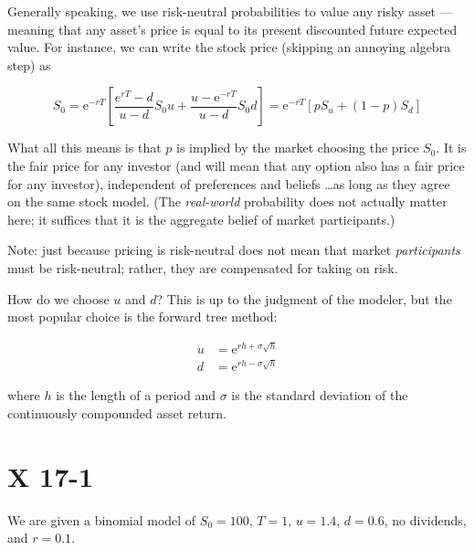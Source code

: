 \documentclass[12pt, letterpaper]{article}
\newcommand{\e}{\mathrm{e}}
\begin{document}
    Generally speaking, we use risk-neutral probabilities to value any risky asset --- meaning that any asset's price is equal to its present discounted future expected value. For instance, we can write the stock price (skipping an annoying algebra step) as

    \[ S_0 = \e^{-rT} \left[ \frac{e^{rT} - d}{u - d} S_0 u + \frac{u - \e^{-rT}}{u - d} S_0 d \right] = \e^{-rT} \left[ p S_u + (1 - p) S_d \right]   \]

    What all this means is that \(p\) is implied by the market choosing the price \(S_0\). It is the fair price for any investor (and will mean that any option also has a fair price for any investor), independent of preferences and beliefs \dots  as long as they agree on the same stock model. (The \emph{real-world} probability does not actually matter here; it suffices that it is the aggregate belief of market participants.) 

    Note: just because pricing is risk-neutral does not mean that market \emph{participants} must be risk-neutral; rather, they are compensated for taking on risk.

    How do we choose \(u\) and \(d\)? This is up to the judgment of the modeler, but the most popular choice is the forward tree method:

    \begin{align*}
    u &= \e^{rh + \sigma \sqrt{h}} \\
    d &= \e^{rh - \sigma \sqrt{h}}
    \end{align*}

    where \(h\) is the length of a period and \(\sigma\) is the standard deviation of the continuously compounded asset return.

    \section{X 17-1}

    We are given a binomial model of \(S_0 = 100\), \(T = 1\), \(u = 1.4\), \(d = 0.6\), no dividends, and \(r = 0.1\). 
\end{document}
